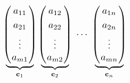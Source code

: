 {\begin{frame}
\begin{columns}[c]
\begin{column}{1.15\textwidth}
\[\begin{array}{@{\hspace{0.1\tabcolsep}}c@{\hspace{2\tabcolsep}}c@{\hspace{2\tabcolsep}}c@{\hspace{0.1\tabcolsep}}}
\begin{array}{@{\hspace{0.1\tabcolsep}}c@{\hspace{0.5\tabcolsep}}c@{\hspace{0.5\tabcolsep}}l@{\hspace{0.1\tabcolsep}}}
		\end{array}
		& 
		{
			\begin{array}{@{\hspace{0.1\tabcolsep}}c@{\hspace{1.3\tabcolsep}}c@{\hspace{1.3\tabcolsep}}c@{\hspace{1.3\tabcolsep}}c@{\hspace{0.1\tabcolsep}}}\\[8mm]
			\underbrace{\!\!
				\left(
				\begin{array}{@{\hspace{0.1\tabcolsep}}c@{\hspace{0.1\tabcolsep}}}
				a_{11}\\[1mm]
				a_{21}\\[1mm]
				\vdots \\[0mm]
				a_{m1}
				\end{array}
				\right)
				\!\!}_{\mathbf{c}_1}
			& 
			\underbrace{\!\!
				\left(
				\begin{array}{@{\hspace{0.1\tabcolsep}}c@{\hspace{0.1\tabcolsep}}}
				a_{12}\\[1mm]
				a_{22}\\[1mm]
				\vdots \\[0mm]
				a_{m2}
				\end{array}
				\right)
				\!\!}_{\mathbf{c}_2}
			& 
			\cdots
			& 
			\underbrace{\!\!
				\left(
				\begin{array}{@{\hspace{0.1\tabcolsep}}c@{\hspace{0.1\tabcolsep}}}
				a_{1n}\\[1mm]
				a_{2n}\\[1mm]
				\vdots \\[0mm]
				a_{mn}
				\end{array}
				\right)
				\!\!}_{\mathbf{c}_n}
			\end{array}
			\atop
		}				
		\end{array}		
		\]
	\end{column}
\end{columns}

\vspace{-5mm}



\end{frame}}
